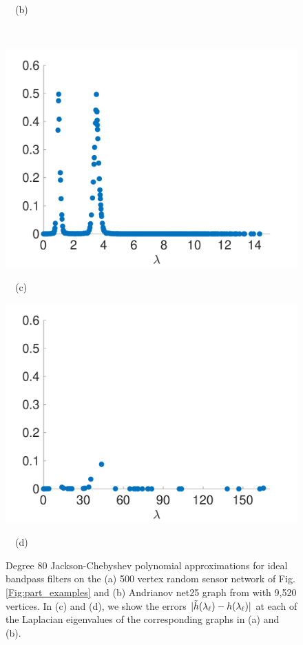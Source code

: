 \documentclass[journal, 10pt]{IEEEtran}
\begin{document}
\begin{figure}[tb]
\begin{minipage}[m]{0.49\linewidth}
\centerline{~~\small{(b)}}
\end{minipage} \\
\begin{minipage}[m]{0.49\linewidth}
\centerline{\includegraphics[width=.9\linewidth]{fig_approx_filter_sensor_error}}
\centerline{~~\small{(c)}}
\end{minipage}
\begin{minipage}[m]{0.49\linewidth}
\centerline{\includegraphics[width=.9\linewidth]{fig_approx_filter_net25_error}}
\centerline{~~\small{(d)}}
\end{minipage}
\caption{Degree 80 Jackson-Chebyshev polynomial approximations for ideal bandpass filters on the (a) 500 vertex random sensor network of Fig. \ref{Fig:part_examples} and (b) Andrianov net25 graph from \cite{davis2011university} with 9,520 vertices. In (c) and (d), we show the errors $|\tilde{h}(\lambda_{\ell})-h(\lambda_{\ell})|$ at each of the Laplacian eigenvalues of the corresponding graphs in (a) and (b).}
\label{Fig:approx_filtering_error}
\end{figure}
\end{document}

